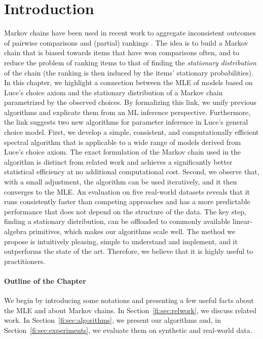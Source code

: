 \section{Introduction}
\label{fi:sec:intro}

Markov chains have been used in recent work to aggregate inconsistent outcomes of pairwise comparisons and (partial) rankings \citep{dwork2001rank, negahban2012iterative, azari2013generalized}.
The idea is to build a Markov chain that is biased towards items that have won comparisons often, and to reduce the problem of ranking items to that of finding the \emph{stationary distribution} of the chain (the ranking is then induced by the items' stationary probabilities).
In this chapter, we highlight a connection between the MLE of models based on Luce's choice axiom and the stationary distribution of a Markov chain parametrized by the observed choices.
By formalizing this link, we unify previous algorithms and explicate them from an ML inference perspective.
Furthermore, the link suggests two new algorithms for parameter inference in Luce's general choice model.
First, we develop a simple, consistent, and computationally efficient spectral algorithm that is applicable to a wide range of models derived from Luce's choice axiom.
The exact formulation of the Markov chain used in the algorithm is distinct from related work \citep{negahban2012iterative, azari2013generalized} and achieves a significantly better statistical efficiency at no additional computational cost.
Second, we observe that, with a small adjustment, the algorithm can be used iteratively, and it then converges to the MLE.
An evaluation on five real-world datasets reveals that it runs consistently faster than competing approaches and has a more predictable performance that does not depend on the structure of the data.
The key step, finding a stationary distribution, can be offloaded to commonly available linear-algebra primitives, which makes our algorithms  scale well.
The method we propose is intuitively pleasing, simple to understand and implement, and it outperforms the state of the art.
Therefore, we believe that it is highly useful to practitioners.

\paragraph{Outline of the Chapter}
We begin by introducing some notations and presenting a few useful facts about the MLE and about Markov chains.
In Section~\ref{fi:sec:relwork}, we discuss related work.
In Section~\ref{fi:sec:algorithms}, we present our algorithms and, in Section~\ref{fi:sec:experiments}, we evaluate them on synthetic and real-world data.


